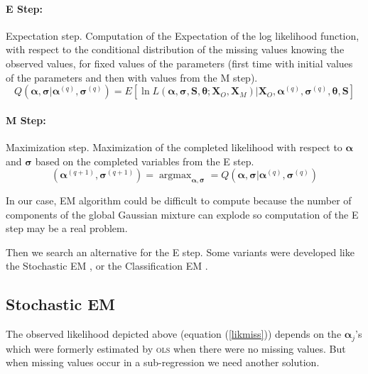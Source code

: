 \documentclass[12pt,a4paper]{report}
\begin{document}
\paragraph{E Step:} Expectation step. Computation of the Expectation of the log likelihood function, with respect to the conditional distribution of the missing values knowing the observed values, for fixed values of the parameters (first time with initial values of the parameters and then with values from the M step).
	\begin{equation}
	   Q(\boldsymbol{\alpha},\boldsymbol{\sigma}|\boldsymbol{\alpha}^{(q)},\boldsymbol{\sigma}^{(q)})= E\left[\ln L(\boldsymbol{\alpha},\boldsymbol{\sigma},\boldsymbol{S},\boldsymbol{\theta};\boldsymbol{X}_O,\boldsymbol{X}_M)|\boldsymbol{X}_O,\boldsymbol{\alpha}^{(q)},\boldsymbol{\sigma}^{(q)},\boldsymbol{\theta},\boldsymbol{S} \right]     \nonumber
	\end{equation}
	
\paragraph{M Step:} Maximization step. Maximization of the completed likelihood with respect to $\boldsymbol{\alpha}$ and $\boldsymbol{\sigma}$ based on the completed variables from the E step.
	\begin{equation}
		(\boldsymbol{\alpha}^{(q+1)},\boldsymbol{\sigma}^{(q+1)})=\operatorname{argmax}_{\boldsymbol{\alpha},\boldsymbol{\sigma}}= Q(\boldsymbol{\alpha},\boldsymbol{\sigma}|\boldsymbol{\alpha}^{(q)},\boldsymbol{\sigma}^{(q)})	\nonumber
	\end{equation}
	
	
	In our case, EM algorithm could be difficult to compute because the number of components of the global Gaussian mixture can explode so computation of the E step may be a real problem.
			
			 Then we search an alternative for the E step. Some variants were developed like the Stochastic EM \cite{diebolt1996stochastic},
			 \cite{celeux1986algorithme} or the Classification EM \cite{celeux1992classification}. 
						
\subsection{Stochastic EM}\label{sectionSEMalgo}
	The observed likelihood depicted above (equation (\ref{likmiss})) depends on the $\boldsymbol{\alpha}_j$'s which were formerly estimated by \textsc{ols} when there were no missing values. But when missing values occur in a sub-regression we need another solution.\\
	
\end{document}
